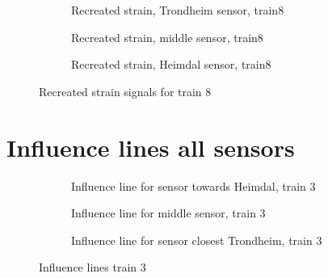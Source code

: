 \begin{figure}[h]
  \begin{subfigure}[t]{0.9\textwidth}
    \centering
    
    \caption{Recreated strain, Trondheim sensor, train8} %
    \label{recreated_sensor_trond_train8}
  \end{subfigure}
%
  \begin{subfigure}[t]{0.9\textwidth}
    \centering
    
    \caption{Recreated strain, middle sensor, train8} %
    \label{recreated_sensor_middle_train8}
  \end{subfigure}
%
  \begin{subfigure}[t]{0.9\textwidth}
    \centering
    
    \caption{Recreated strain, Heimdal sensor, train8} %
    \label{recreated_sensor_heimdal_train8}
  \end{subfigure}
%
  \caption{Recreated strain signals for train 8}
  \label{fig:recreated_strains_train8}
\end{figure}%

\section{Influence lines all sensors}%

\begin{figure}[h]
  \begin{subfigure}[t]{0.9\textwidth}
    \centering
    
    \caption{Influence line for sensor towards Heimdal, train 3}
    \label{infl_Heimdal_train3}
  \end{subfigure}
  \begin{subfigure}[t]{0.9\textwidth}
    \centering
    
    \caption{Influence line for middle sensor, train 3}
    \label{infl_middle_train3}
  \end{subfigure}
  \begin{subfigure}[t]{0.9\textwidth}
    \centering
    
    \caption{Influence line for sensor closest Trondheim, train 3}
    \label{infl_Trondheim_train3}
  \end{subfigure}
  \caption{Influence lines train 3}
  \label{influence_lines_train3}
\end{figure}


